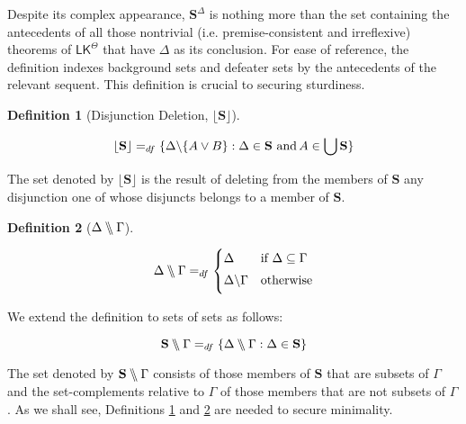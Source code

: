\documentclass{article}
\theoremstyle{definition}
\theoremstyle{definition}
\theoremstyle{definition}
\theoremstyle{definition}
\newtheorem{definition}{Definition}
\theoremstyle{remark}
\theoremstyle{definition}
\theoremstyle{definition}
\begin{document}
Despite its complex appearance, $\mathbf{S}^{\Delta}$ is nothing more than the set containing the antecedents of all those nontrivial (i.e. premise-consistent and irreflexive) theorems of $\mathsf{LK}^\Theta$ that have $\Delta$ as its conclusion. For ease of reference, the definition indexes background sets and defeater sets by the antecedents of the relevant sequent. This definition is crucial to securing sturdiness.

\begin{definition}[Disjunction Deletion, $ \lfloor \mathbf{S} \rfloor $]\label{disjsub}
	
	
	
	
	
	$$ \lfloor\mathbf{S}\rfloor =_{df} \{ \Delta\backslash\{A \vee B\} : \Delta \in \mathbf{S} \text{\,\,and\,} A \in\bigcup\mathbf{S} \} $$
	
	
\end{definition}

The set denoted by $ \lfloor\mathbf{S} \rfloor $ is the result of deleting from the members of $ \mathbf{S} $ any disjunction one of whose disjuncts belongs to a member of $ \mathbf{S} $. 


\begin{definition}[$ \Delta\bbslash\Gamma  $]\label{bbslash}
	
	\begin{equation}
	\Delta\bbslash\Gamma =_{df}
	\begin{cases}\nonumber
	\Delta   & \text{if}\,\, \Delta \subseteq \Gamma \\[3pt] 
	\Delta\backslash\Gamma & \text{otherwise}  \\[3pt] 
	\end{cases}
	\end{equation}
	
	We extend the definition to sets of sets as follows:
	
	$$ \mathbf{S}\bbslash\Gamma =_{df} \{\Delta\bbslash\Gamma : \Delta \in \mathbf{S}  \} $$
	
	
\end{definition}

The set denoted by $ \mathbf{S}\bbslash\Gamma $ consists of those members of $ \mathbf{S} $ that are subsets of $ \Gamma $ and the set-complements relative to $ \Gamma $ of those members that are not subsets of $ \Gamma $. As we shall see, Definitions \ref{disjsub} and \ref{bbslash} are needed to secure minimality.




\end{document}
